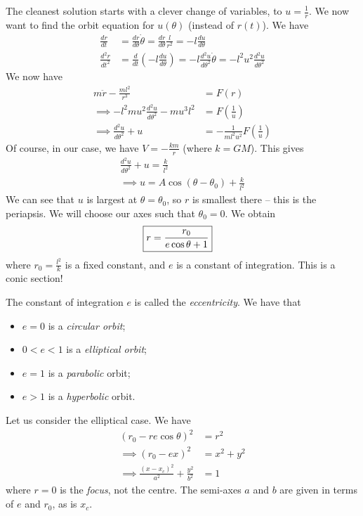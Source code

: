 \documentclass{../../template/note}
\begin{document}
    The cleanest solution starts with a clever change of variables, to \(u = \frac 1 r\). We now want to find the orbit equation for \(u(\theta)\) (instead of \(r(t)\)). We have
    \begin{align*}
        \frac{dr}{dt} &= \frac{dr}{d\theta} \dot \theta = \frac{dr}{d\theta} \frac{l}{r^2} = -l \frac{du}{d\theta} \\
        \frac{d^2r}{dt^2} &= \frac{d}{dt}\left(-l \frac{du}{d\theta}\right) = -l \frac{d^2u}{d\theta^2}\dot \theta = -l^2u^2 \frac{d^2u}{d\theta^2}
    \end{align*}
    We now have
    \begin{align*}
        m \ddot r - \frac{ml^2}{r^3} &= F(r) \\
        \implies -l^2mu^2 \frac{d^2u}{d\theta^2} - mu^3l^2 &= F\left(\frac 1 u\right) \\
        \implies \frac{d^2u}{d\theta^2} + u &= -\frac{1}{ml^2u^2}F\left(\frac 1 u\right)
    \end{align*}
    Of course, in our case, we have \(V = -\frac{km}{r}\) (where \(k = GM\)). This gives
    \begin{align*}
        \frac{d^2u}{d\theta^2} + u = \frac{k}{l^2} \\
        \implies u = A \cos (\theta - \theta_0) + \frac{k}{l^2}
    \end{align*}
    We can see that \(u\) is largest at \(\theta = \theta_0\), so \(r\) is smallest there -- this is the periapsis. We will choose our axes such that \(\theta_0 = 0\). We obtain
    \begin{align*}
        \Aboxed{r = \frac{r_0}{e \cos \theta + 1}}
    \end{align*}
    where \(r_0 = \frac{l^2}{k}\) is a fixed constant, and \(e\) is a constant of integration. This is a conic section!

    The constant of integration \(e\) is called the \emph{eccentricity}. We have that
    \begin{itemize}
        \item \(e = 0\) is a \emph{circular orbit};
        \item \(0 < e < 1\) is a \emph{elliptical orbit};
        \item \(e = 1\) is a \emph{parabolic} orbit;
        \item \(e > 1\) is a \emph{hyperbolic} orbit.
    \end{itemize}
    
    Let us consider the elliptical case. We have
    \begin{align*}
        (r_0 - re\cos \theta)^2 &= r^2 \\
        \implies (r_0-ex)^2 &= x^2 + y^2 \\
        \implies \frac{(x-x_c)^2}{a^2} + \frac{y^2}{b^2} &= 1
    \end{align*}
    where \(r=0\) is the \emph{focus}, not the centre. The semi-axes \(a\) and \(b\) are given in terms of \(e\) and \(r_0\), as is \(x_c\).
\end{document}
